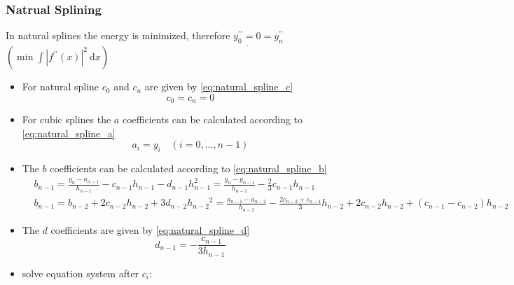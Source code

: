 \subsubsection{Natrual Splining}
In natural splines the energy is minimized, therefore $\underline{y_{0}^{\prime \prime}=0}=y_{n}^{\prime \prime}$  $\left(\min \int\left|f^{\prime \prime}(x)\right|^{2} \mathrm{~d} x\right)$
\begin{itemize}
    \item For natural spline $c_0$ and $c_n$ are given by \autoref{eq:natural_spline_c}
    \begin{equation}\label{eq:natural_spline_c}
    c_{0}=c_{n}=0
    \end{equation}
    \item For cubic splines the $a$ coefficients can be calculated according to \autoref{eq:natural_spline_a}
    \begin{equation}\label{eq:natural_spline_a}
    a_i=y_i \quad (i=0,...,n-1)
    \end{equation}
    \item The $b$ coefficients can be calculated according to \autoref{eq:natural_spline_b}
    \begin{equation}\label{eq:natural_spline_b}
    \begin{aligned}
    & b_{n-1}=\frac{y_n-a_{n-1}}{h_{n-1}}-c_{n-1} h_{n-1}-d_{n-1} h_{n-1}^2=\frac{y_n-y_{n-1}}{h_{n-1}}-\frac{2}{3} c_{n-1} h_{n-1} \\
    & b_{n-1}=b_{n-2}+2 c_{n-2} h_{n-2}+3 d_{n-2} h_{n-2}{ }^2=\frac{a_{n-1}-a_{n-2}}{h_{n-2}}-\frac{2 c_{n-2}+c_{n-1}}{3} h_{n-2}+2 c_{n-2} h_{n-2}+\left(c_{n-1}-c_{n-2}\right) h_{n-2}
    \end{aligned}
    \end{equation}
    \item The $d$ coefficients are given by \autoref{eq:natural_spline_d}
    \begin{equation}\label{eq:natural_spline_d}
        d_{n-1}=-\frac{c_{n-1}}{3 h_{n-1}}
    \end{equation}
    \item solve equation system after $c_{i}$:
\end{itemize}

